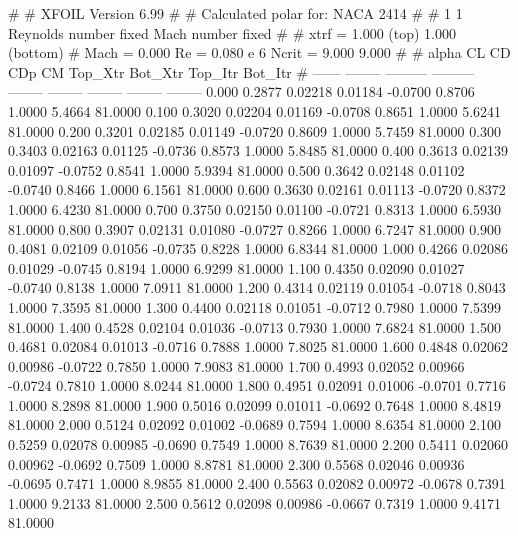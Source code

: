 #  
#       XFOIL         Version 6.99
#  
# Calculated polar for: NACA 2414                                       
#  
# 1 1 Reynolds number fixed          Mach number fixed         
#  
# xtrf =   1.000 (top)        1.000 (bottom)  
# Mach =   0.000     Re =     0.080 e 6     Ncrit =   9.000  9.000
#  
#   alpha    CL        CD       CDp       CM     Top_Xtr  Bot_Xtr  Top_Itr  Bot_Itr
#  ------ -------- --------- --------- -------- -------- -------- -------- --------
   0.000   0.2877   0.02218   0.01184  -0.0700   0.8706   1.0000   5.4664  81.0000
   0.100   0.3020   0.02204   0.01169  -0.0708   0.8651   1.0000   5.6241  81.0000
   0.200   0.3201   0.02185   0.01149  -0.0720   0.8609   1.0000   5.7459  81.0000
   0.300   0.3403   0.02163   0.01125  -0.0736   0.8573   1.0000   5.8485  81.0000
   0.400   0.3613   0.02139   0.01097  -0.0752   0.8541   1.0000   5.9394  81.0000
   0.500   0.3642   0.02148   0.01102  -0.0740   0.8466   1.0000   6.1561  81.0000
   0.600   0.3630   0.02161   0.01113  -0.0720   0.8372   1.0000   6.4230  81.0000
   0.700   0.3750   0.02150   0.01100  -0.0721   0.8313   1.0000   6.5930  81.0000
   0.800   0.3907   0.02131   0.01080  -0.0727   0.8266   1.0000   6.7247  81.0000
   0.900   0.4081   0.02109   0.01056  -0.0735   0.8228   1.0000   6.8344  81.0000
   1.000   0.4266   0.02086   0.01029  -0.0745   0.8194   1.0000   6.9299  81.0000
   1.100   0.4350   0.02090   0.01027  -0.0740   0.8138   1.0000   7.0911  81.0000
   1.200   0.4314   0.02119   0.01054  -0.0718   0.8043   1.0000   7.3595  81.0000
   1.300   0.4400   0.02118   0.01051  -0.0712   0.7980   1.0000   7.5399  81.0000
   1.400   0.4528   0.02104   0.01036  -0.0713   0.7930   1.0000   7.6824  81.0000
   1.500   0.4681   0.02084   0.01013  -0.0716   0.7888   1.0000   7.8025  81.0000
   1.600   0.4848   0.02062   0.00986  -0.0722   0.7850   1.0000   7.9083  81.0000
   1.700   0.4993   0.02052   0.00966  -0.0724   0.7810   1.0000   8.0244  81.0000
   1.800   0.4951   0.02091   0.01006  -0.0701   0.7716   1.0000   8.2898  81.0000
   1.900   0.5016   0.02099   0.01011  -0.0692   0.7648   1.0000   8.4819  81.0000
   2.000   0.5124   0.02092   0.01002  -0.0689   0.7594   1.0000   8.6354  81.0000
   2.100   0.5259   0.02078   0.00985  -0.0690   0.7549   1.0000   8.7639  81.0000
   2.200   0.5411   0.02060   0.00962  -0.0692   0.7509   1.0000   8.8781  81.0000
   2.300   0.5568   0.02046   0.00936  -0.0695   0.7471   1.0000   8.9855  81.0000
   2.400   0.5563   0.02082   0.00972  -0.0678   0.7391   1.0000   9.2133  81.0000
   2.500   0.5612   0.02098   0.00986  -0.0667   0.7319   1.0000   9.4171  81.0000
